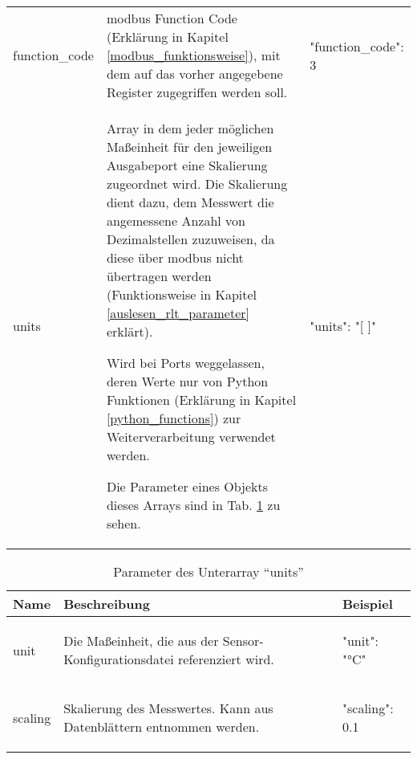 \begin{enumerate}
\begin{longtable}[h]{p{} p{} | p{}}
    function\_code 	& \gls{modbus} Function Code (Erklärung in Kapitel \ref{modbus_funktionsweise}), mit dem auf das vorher angegebene Register zugegriffen werden soll. %
    & 
    \begin{jsonTable}
"function_code": 3
    \end{jsonTable} 
    \\
    units 	& Array in dem jeder möglichen Maßeinheit für den jeweiligen Ausgabeport eine Skalierung zugeordnet wird. Die Skalierung dient \zB dazu, dem Messwert die angemessene Anzahl von Dezimalstellen zuzuweisen, da diese über \gls{modbus} nicht übertragen werden (Funktionsweise in Kapitel \ref{auslesen_rlt_parameter} erklärt).
    
    Wird bei Ports weggelassen, deren Werte nur von Python Funktionen (Erklärung in Kapitel \ref{python_functions}) zur Weiterverarbeitung verwendet werden. 
    
    Die Parameter eines Objekts dieses Arrays sind in Tab. \ref{tab:units_array_parameter} zu sehen.  & 
    \begin{jsonTable}
"units": "[ ]"
    \end{jsonTable} 
    \\
\end{longtable}

	
\begin{table}[H]
    \caption{Parameter des Unterarray \enquote{units}}
    \label{tab:units_array_parameter}
    \begin{tabular}{p{} p{} | p{}}
        \toprule
        \textbf{Name} & \textbf{Beschreibung} & \textbf{Beispiel} \\
        \midrule
        unit      	& Die Maßeinheit, die aus der Sensor-Konfigurationsdatei referenziert wird. & 
        \begin{jsonTable}
"unit": "°C"
        \end{jsonTable} 
        \\
        scaling 	& Skalierung des Messwertes. Kann aus Datenblättern entnommen werden. & 
        \begin{jsonTable}
"scaling": 0.1
        \end{jsonTable} 
        \\
        \bottomrule
    \end{tabular}
\end{table}
		

\end{enumerate}
